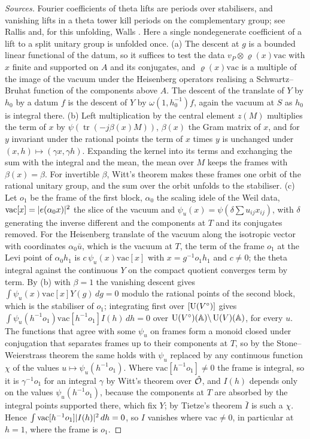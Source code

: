 \begin{proof}[Sources]
Fourier coefficients of theta lifts are periods over stabilisers, and vanishing lifts in a theta tower kill periods on the complementary group; see Rallis \cite{RallisHowe1984} and, for this unfolding,
Walls \cite[Prop.~2.1.1]{Walls2015}. Here a single nondegenerate coefficient of a lift to a split unitary group is unfolded once. (a) The descent at $g$ is a bounded linear functional of the datum, so it suffices to
test the data $v_P\otimes\varrho(x)\mathrm{vac}$ with $x$ finite and supported on $A$ and its conjugates, and $\varrho(x)\mathrm{vac}$ is a multiple of the image of the vacuum under the Heisenberg operators realising a
Schwartz--Bruhat function of the components above $A$. The descent of the translate of $Y$ by $h_0$ by a datum $f$ is the descent of $Y$ by $\omega(1,h_0^{-1})f$, again the vacuum at $S$ as $h_0$ is integral there. (b)
Left multiplication by the central element $z(M)$ multiplies the term of $x$ by $\psi(\operatorname{tr}(-j\beta(x)M))$, $\beta(x)$ the Gram matrix of $x$, and for $y$ invariant under the rational points the term of $x$ times $y$ is
unchanged under $(x,h)\mapsto(\gamma x,\gamma h)$. Expanding the kernel into its terms and exchanging the sum with the integral and the mean, the mean over $M$ keeps the frames with $\beta(x)=\beta$. For invertible $\beta$,
Witt's theorem makes these frames one orbit of the rational unitary group, and the sum over the orbit unfolds to the stabiliser. (c) Let $o_1$ be the frame of the first block, $\alpha_0$ the scaling idele of the Weil data,
$\mathrm{vac}[x]=\lvert e(\alpha_0x)\rvert^2$ the slice of the vacuum and $\psi_u(x)=\psi(\delta\sum u_{ij}x_{ij})$, with $\delta$ generating the inverse different and the components at $T$ and its conjugates removed. For the Heisenberg
translate of the vacuum along the isotropic vector with coordinates $\alpha_0\bar u$, which is the vacuum at $T$, the term of the frame $o_1$ at the Levi point of $\alpha_0h_1$ is $c\,\psi_u(x)\mathrm{vac}[x]$ with
$x=g^{-1}o_1h_1$ and $c\ne0$; the theta integral against the continuous $Y$ on the compact quotient converges term by term. By (b) with $\beta=1$ the vanishing descent gives $\int\psi_u(x)\mathrm{vac}[x]Y(g)\,dg=0$ modulo the
rational points of the second block, which is the stabiliser of $o_1$; integrating first over $[\operatorname{U}(V^\circ)]$ gives $\int\psi_u(h^{-1}o_1)\mathrm{vac}[h^{-1}o_1]I(h)\,dh=0$ over $\operatorname{U}(V^\circ)(\mathbb{A})\backslash\operatorname{U}(V)(\mathbb{A})$, for every $u$. The functions
that agree with some $\psi_u$ on frames form a monoid closed under conjugation that separates frames up to their components at $T$, so by the Stone--Weierstrass theorem the same holds with $\psi_u$ replaced by any
continuous function $\chi$ of the values $u\mapsto\psi_u(h^{-1}o_1)$. Where $\mathrm{vac}[h^{-1}o_1]\ne0$ the frame is integral, so it is $\gamma^{-1}o_1$ for an integral $\gamma$ by Witt's theorem over $\hat{\mathcal{O}}$, and $I(h)$ depends only on the
values $\psi_u(h^{-1}o_1)$, because the components at $T$ are absorbed by the integral points supported there, which fix $Y$; by Tietze's theorem $\bar I$ is such a $\chi$. Hence $\int\mathrm{vac}[h^{-1}o_1]\lvert I(h)\rvert^2\,dh=0$, so $I$
vanishes where $\mathrm{vac}\ne0$, in particular at $h=1$, where the frame is $o_1$.
\end{proof}

